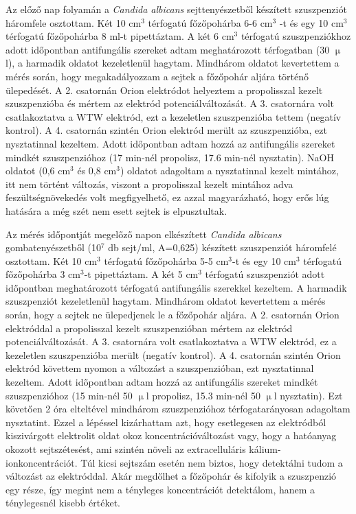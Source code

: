 Az előző nap folyamán a \emph{Candida albicans} sejttenyészetből készített szuszpenziót háromfele osztottam. Két 10 cm$^3$ térfogatú főzőpohárba 6-6 cm$^3$ -t és egy 10 cm$^3$ térfogatú főzőpohárba 8 ml-t pipettáztam. A két 6 cm$^3$ térfogatú szuszpenziókhoz adott időpontban antifungális szereket adtam meghatározott térfogatban (30 $\upmu$l), a harmadik oldatot kezeletlenül hagytam. Mindhárom oldatot kevertettem a mérés során, hogy megakadályozzam a sejtek a főzőpohár aljára történő ülepedését. A 2. csatornán Orion elektródot helyeztem a propolisszal kezelt szuszpenzióba és mértem az elektród potenciálváltozását. A 3. csatornára volt csatlakoztatva a WTW elektród, ezt a kezeletlen szuszpenzióba tettem (negatív kontrol). A 4. csatornán szintén Orion elektród merült az szuszpenzióba, ezt nysztatinnal kezeltem. Adott időpontban adtam hozzá az antifungális szereket mindkét szuszpenzióhoz (17 min-nél propolisz, 17.6 min-nél nysztatin). NaOH oldatot (0,6 cm$^3$ és 0,8 cm$^3$) oldatot adagoltam a nysztatinnal kezelt mintához, itt nem történt változás, viszont a propolisszal kezelt mintához adva feszültségnövekedés volt megfigyelhető, ez azzal magyarázható, hogy erős lúg hatására a még szét nem esett sejtek is elpusztultak. 

Az mérés időpontját megelőző napon elkészített \emph{Candida albicans} gombatenyészetből (10$^7$ db sejt/ml, A=0,625) készített szuszpenziót háromfelé osztottam. Két 10 cm$^3$ térfogatú főzőpohárba 5-5 cm$^3$-t és egy 10 cm$^3$ térfogatú főzőpohárba 3 cm$^3$-t pipettáztam. A két 5 cm$^3$ térfogatú szuszpenziót adott időpontban meghatározott térfogatú antifungális szerekkel kezeltem. A harmadik szuszpenziót kezeletlenül hagytam. Mindhárom oldatot kevertettem a mérés során, hogy a sejtek ne ülepedjenek le a főzőpohár aljára. A 2. csatornán Orion elektróddal a propolisszal kezelt szuszpenzióban mértem az elektród potenciálváltozását. A 3. csatornára volt csatlakoztatva a WTW elektród, ez a kezeletlen szuszpenzióba merült (negatív kontrol). A 4. csatornán szintén Orion elektród követtem nyomon a változást a szuszpenzióban, ezt nysztatinnal kezeltem. Adott időpontban adtam hozzá az antifungális szereket mindkét szuszpenzióhoz (15 min-nél 50 $\upmu$l propolisz, 15.3 min-nél 50 $\upmu$l nysztatin). Ezt követően 2 óra elteltével mindhárom szuszpenzióhoz térfogatarányosan adagoltam nysztatint. Ezzel a lépéssel kizárhattam azt, hogy esetlegesen az elektródból kiszivárgott elektrolit oldat okoz koncentrációváltozást vagy, hogy a hatóanyag okozott sejtszétesést, ami szintén növeli az extracelluláris kálium-ionkoncentrációt. Túl kicsi sejtszám esetén nem biztos, hogy detektálni tudom a változást az elektróddal. Akár megdőlhet a főzőpohár és kifolyik a szuszpenzió egy része, így megint nem a tényleges koncentrációt detektálom, hanem a ténylegesnél kisebb értéket. 

